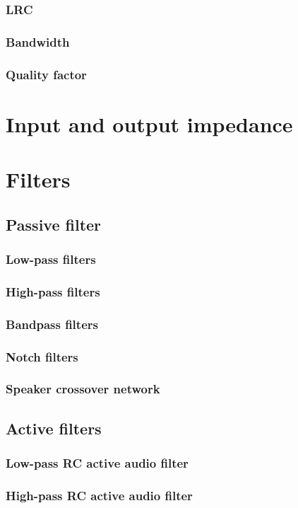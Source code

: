 \documentclass{report}
\begin{document}
\subsubsection{LRC}
\subsubsection{Bandwidth}
\subsubsection{Quality factor}
\section{Input and output impedance}
\section{Filters}
\subsection{Passive filter}
\subsubsection{Low-pass filters}
\subsubsection{High-pass filters}
\subsubsection{Bandpass filters}
\subsubsection{Notch filters}
\subsubsection{Speaker crossover network}
\subsection{Active filters}
\subsubsection{Low-pass RC active audio filter}
\subsubsection{High-pass RC active audio filter}
\end{document}
